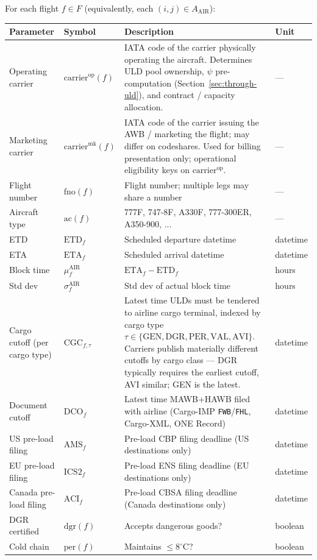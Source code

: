 \documentclass[11pt,a4paper]{article}
\theoremstyle{definition}
\begin{document}
For each flight $f \in F$ (equivalently, each $(i,j) \in A_{\text{AIR}}$):

\begin{center}
\begin{tabular}{llp{7cm}l}
\toprule
Parameter & Symbol & Description & Unit \\
\midrule
Operating carrier & $\text{carrier}^{\text{op}}(f)$ & IATA code of the carrier physically operating the aircraft. Determines ULD pool ownership, $\psi$ pre-computation (Section~\ref{sec:through-uld}), and contract / capacity allocation. & — \\
Marketing carrier & $\text{carrier}^{\text{mk}}(f)$ & IATA code of the carrier issuing the AWB / marketing the flight; may differ on codeshares. Used for billing presentation only; operational eligibility keys on $\text{carrier}^{\text{op}}$. & — \\
Flight number & $\text{fno}(f)$ & Flight number; multiple legs may share a number & — \\
Aircraft type & $\text{ac}(f)$ & 777F, 747-8F, A330F, 777-300ER, A350-900, ... & — \\
ETD & $\text{ETD}_f$ & Scheduled departure datetime & datetime \\
ETA & $\text{ETA}_f$ & Scheduled arrival datetime & datetime \\
Block time & $\mu_f^{\text{AIR}}$ & $\text{ETA}_f - \text{ETD}_f$ & hours \\
Std dev & $\sigma_f^{\text{AIR}}$ & Std dev of actual block time & hours \\
Cargo cutoff (per cargo type) & $\text{CGC}_{f,\tau}$ & Latest time ULDs must be tendered to airline cargo terminal, indexed by cargo type $\tau \in \{\text{GEN}, \text{DGR}, \text{PER}, \text{VAL}, \text{AVI}\}$. Carriers publish materially different cutoffs by cargo class --- DGR typically requires the earliest cutoff, AVI similar; GEN is the latest. & datetime \\
Document cutoff & $\text{DCO}_f$ & Latest time MAWB+HAWB filed with airline (Cargo-IMP \texttt{FWB}/\texttt{FHL}, Cargo-XML, ONE Record) & datetime \\
US pre-load filing & $\text{AMS}_f$ & Pre-load CBP filing deadline (US destinations only) & datetime \\
EU pre-load filing & $\text{ICS2}_f$ & Pre-load ENS filing deadline (EU destinations only) & datetime \\
Canada pre-load filing & $\text{ACI}_f$ & Pre-load CBSA filing deadline (Canada destinations only) & datetime \\
DGR certified & $\text{dgr}(f)$ & Accepts dangerous goods? & boolean \\
Cold chain & $\text{per}(f)$ & Maintains $\leq 8^\circ$C? & boolean \\
\bottomrule
\end{tabular}
\end{center}
\end{document}
